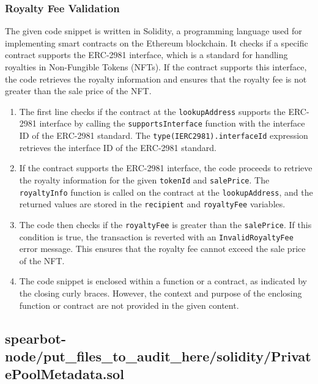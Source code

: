 \hypertarget{royalty-fee-validation-1}{%
\subsubsection{Royalty Fee Validation}\label{royalty-fee-validation-1}}

The given code snippet is written in Solidity, a programming language
used for implementing smart contracts on the Ethereum blockchain. It
checks if a specific contract supports the ERC-2981 interface, which is
a standard for handling royalties in Non-Fungible Tokens (NFTs). If the
contract supports this interface, the code retrieves the royalty
information and ensures that the royalty fee is not greater than the
sale price of the NFT.

\begin{enumerate}
\def\labelenumi{\arabic{enumi}.}
\item
  The first line checks if the contract at the \texttt{lookupAddress}
  supports the ERC-2981 interface by calling the
  \texttt{supportsInterface} function with the interface ID of the
  ERC-2981 standard. The \texttt{type(IERC2981).interfaceId} expression
  retrieves the interface ID of the ERC-2981 standard.
\item
  If the contract supports the ERC-2981 interface, the code proceeds to
  retrieve the royalty information for the given \texttt{tokenId} and
  \texttt{salePrice}. The \texttt{royaltyInfo} function is called on the
  contract at the \texttt{lookupAddress}, and the returned values are
  stored in the \texttt{recipient} and \texttt{royaltyFee} variables.
\item
  The code then checks if the \texttt{royaltyFee} is greater than the
  \texttt{salePrice}. If this condition is true, the transaction is
  reverted with an \texttt{InvalidRoyaltyFee} error message. This
  ensures that the royalty fee cannot exceed the sale price of the NFT.
\item
  The code snippet is enclosed within a function or a contract, as
  indicated by the closing curly braces. However, the context and
  purpose of the enclosing function or contract are not provided in the
  given content.
\end{enumerate}

\hypertarget{spearbot-nodeput_files_to_audit_heresolidityprivatepoolmetadatasol}{%
\subsection{spearbot-node/put\_files\_to\_audit\_here/solidity/PrivatePoolMetadata.sol}\label{spearbot-nodeput_files_to_audit_heresolidityprivatepoolmetadatasol}}

